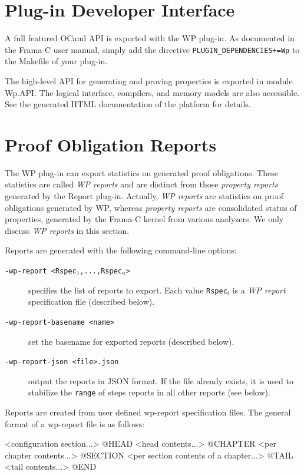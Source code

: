 \section{Plug-in Developer Interface}
\label{wp-api}

A full featured \textsf{OCaml} API is exported with the
\textsf{WP} plug-in. As documented in the \textsf{Frama-C} user manual, simply add the directive \verb!PLUGIN_DEPENDENCIES+=Wp! to the Makefile of your plug-in.

The high-level API for generating and proving properties is exported
in module \textsf{Wp.API}. The logical interface, compilers, and memory models are also accessible. See the generated \textsf{HTML} documentation of the platform for details.

\section{Proof Obligation Reports}

The \textsf{WP} plug-in can export statistics on generated proof
obligations. These statistics are called \textit{WP reports} and are
distinct from those \textit{property reports} generated by the
\textsf{Report} plug-in. Actually, \textit{WP reports} are statistics
on proof obligations generated by \textsf{WP}, whereas
\textit{property reports} are consolidated status of properties,
generated by the \textsf{Frama-C} kernel from various analyzers.
We only discuss \textit{WP reports} in this section.

Reports are generated with the following command-line options:
\begin{description}
\item[\tt -wp-report <Rspec$_1$,...,Rspec$_n$>] specifies the list of
  reports to export.
  Each value \texttt{Rspec$_i$} is a \textit{WP report} specification file
  (described below).
\item[\tt -wp-report-basename <name>] set the basename for exported
  reports (described below).
\item[\tt -wp-report-json <file>.json] output the reports in JSON format.
  If the file already exists, it is used to stabilize the \verb+range+ of steps
  reports in all other reports (see below).
\end{description}

Reports are created from user defined wp-report specification files.
The general format of a wp-report file is as follows:

\begin{logs}
  <configuration section...>
  @HEAD
  <head contents...>
  @CHAPTER
  <per chapter contents...>
  @SECTION
  <per section contents of a chapter...>
  @TAIL
  <tail contents...>
  @END
\end{logs}

